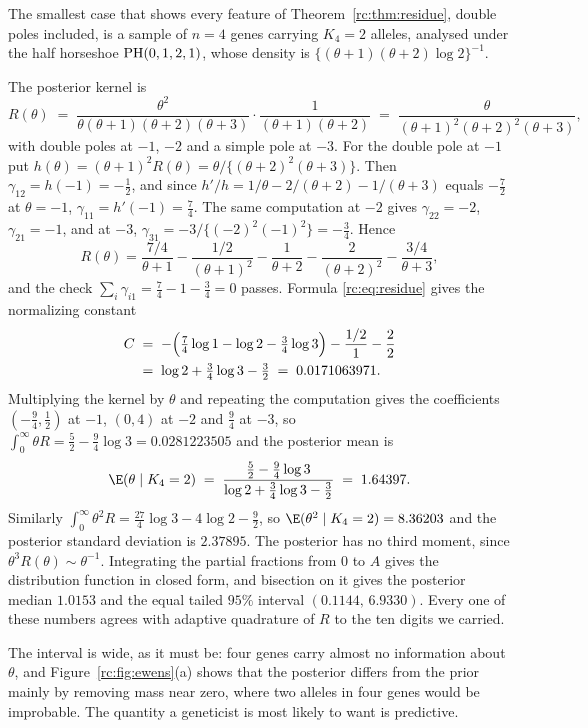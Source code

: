 The smallest case that shows every feature of Theorem~\ref{rc:thm:residue}, double poles included, is a sample of $n=4$ genes carrying $K_4=2$ alleles, analysed under the half horseshoe $\mathrm{PH}(0,1,2,1)$, whose density is $\{(\theta+1)(\theta+2)\log2\}^{-1}$.

\begin{example}\label{rc:ex:four}
The posterior kernel is
\[
R(\theta)\;=\;\frac{\theta^2}{\theta(\theta+1)(\theta+2)(\theta+3)}\cdot\frac{1}{(\theta+1)(\theta+2)}\;=\;\frac{\theta}{(\theta+1)^2(\theta+2)^2(\theta+3)},
\]
with double poles at $-1$, $-2$ and a simple pole at $-3$. For the double pole at $-1$ put $h(\theta)=(\theta+1)^2R(\theta)=\theta/\{(\theta+2)^2(\theta+3)\}$. Then $\gamma_{12}=h(-1)=-\frac12$, and since $h'/h=1/\theta-2/(\theta+2)-1/(\theta+3)$ equals $-\frac72$ at $\theta=-1$, $\gamma_{11}=h'(-1)=\frac74$. The same computation at $-2$ gives $\gamma_{22}=-2$, $\gamma_{21}=-1$, and at $-3$, $\gamma_{31}=-3/\{(-2)^2(-1)^2\}=-\frac34$. Hence
\[
R(\theta)=\frac{7/4}{\theta+1}-\frac{1/2}{(\theta+1)^2}-\frac{1}{\theta+2}-\frac{2}{(\theta+2)^2}-\frac{3/4}{\theta+3},
\]
and the check $\sum_i\gamma_{i1}=\frac74-1-\frac34=0$ passes. Formula \eqref{rc:eq:residue} gives the normalizing constant
\[
\begin{aligned}
C\;&=\;-\Bigl(\tfrac74\log1-\log2-\tfrac34\log3\Bigr)-\frac{1/2}{1}-\frac{2}{2}\\
&=\;\log2+\tfrac34\log3-\tfrac32\;=\;0.0171063971.
\end{aligned}
\]
Multiplying the kernel by $\theta$ and repeating the computation gives the coefficients $(-\frac94,\frac12)$ at $-1$, $(0,4)$ at $-2$ and $\frac94$ at $-3$, so $\int_0^\infty\theta R=\frac52-\frac94\log3=0.0281223505$ and the posterior mean is
\[
\E(\theta\mid K_4=2)\;=\;\frac{\frac52-\frac94\log3}{\log2+\frac34\log3-\frac32}\;=\;1.64397.
\]
Similarly $\int_0^\infty\theta^2R=\frac{27}4\log3-4\log2-\frac92$, so $\E(\theta^2\mid K_4=2)=8.36203$ and the posterior standard deviation is $2.37895$. The posterior has no third moment, since $\theta^3R(\theta)\sim\theta^{-1}$. Integrating the partial fractions from $0$ to $A$ gives the distribution function in closed form, and bisection on it gives the posterior median $1.0153$ and the equal tailed $95\%$ interval $(0.1144,\,6.9330)$. Every one of these numbers agrees with adaptive quadrature of $R$ to the ten digits we carried.
\end{example}

The interval is wide, as it must be: four genes carry almost no information about $\theta$, and Figure~\ref{rc:fig:ewens}(a) shows that the posterior differs from the prior mainly by removing mass near zero, where two alleles in four genes would be improbable. The quantity a geneticist is most likely to want is predictive.

